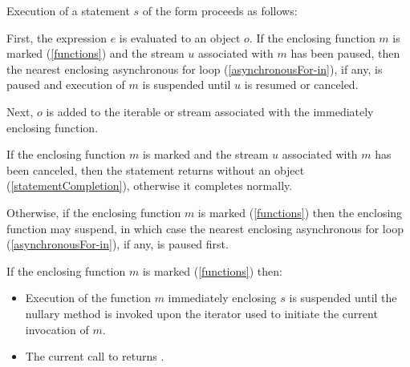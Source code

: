 \documentclass[makeidx]{article}
\begin{document}
\LMHash{}%
Execution of a statement $s$ of the form 
proceeds as follows:

\LMHash{}%
First, the expression $e$ is evaluated to an object $o$.
If the enclosing function $m$ is marked \code{\ASYNC*}
(\ref{functions})
and the stream $u$ associated with $m$ has been paused,
then the nearest enclosing asynchronous for loop
(\ref{asynchronousFor-in}),
if any, is paused and execution of $m$ is suspended
until $u$ is resumed or canceled.

\LMHash{}%
Next, $o$ is added to the iterable or stream associated
with the immediately enclosing function.


\LMHash{}%
If the enclosing function $m$ is marked \code{\ASYNC*}
and the stream $u$ associated with $m$ has been canceled,
then the \YIELD{} statement returns without an object
(\ref{statementCompletion}),
otherwise it completes normally.


\LMHash{}%
Otherwise, if the enclosing function $m$ is marked \code{\ASYNC*}
(\ref{functions})
then the enclosing function may suspend,
in which case the nearest enclosing asynchronous for loop
(\ref{asynchronousFor-in}),
if any, is paused first.


\LMHash{}%
If the enclosing function $m$ is marked \code{\SYNC*} (\ref{functions}) then:
\begin{itemize}
\item
  Execution of the function $m$ immediately enclosing $s$ is suspended
  until the nullary method  is invoked upon
  the iterator used to initiate the current invocation of $m$.
\item
  The current call to  returns \TRUE.
\end{itemize}
\end{document}
